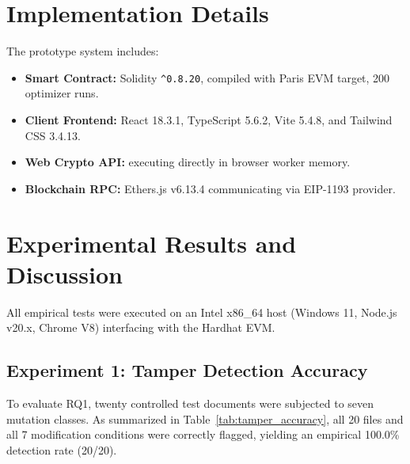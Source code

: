\documentclass[10pt,conference,letterpaper]{IEEEtran}
\begin{document}
\section{Implementation Details}
The prototype system includes:
\begin{itemize}
    \item \textbf{Smart Contract:} Solidity \texttt{\^{}0.8.20}, compiled with Paris EVM target, 200 optimizer runs.
    \item \textbf{Client Frontend:} React 18.3.1, TypeScript 5.6.2, Vite 5.4.8, and Tailwind CSS 3.4.13.
    \item \textbf{Web Crypto API:}  executing directly in browser worker memory.
    \item \textbf{Blockchain RPC:} Ethers.js v6.13.4 communicating via EIP-1193 provider.
\end{itemize}

\section{Experimental Results and Discussion}
All empirical tests were executed on an Intel x86\_64 host (Windows 11, Node.js v20.x, Chrome V8) interfacing with the Hardhat EVM.

\subsection{Experiment 1: Tamper Detection Accuracy}
To evaluate RQ1, twenty controlled test documents were subjected to seven mutation classes. As summarized in Table~\ref{tab:tamper_accuracy}, all 20 files and all 7 modification conditions were correctly flagged, yielding an empirical 100.0\% detection rate (20/20).
\end{document}
